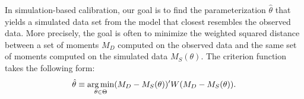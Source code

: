 \noindent In simulation-based calibration, our goal is to find the parameterization $\hat{\theta}$ that yields a simulated data set from the model that closest resembles the observed data. More precisely, the goal is often to minimize the weighted squared distance between a set of moments $M_D$ computed on the observed data and the same set of moments computed on the simulated data $M_S(\theta)$. The criterion function takes the following form:
%
\begin{align*}
    \hat{\theta} \equiv \operatorname*{arg\,min}_{\theta \in \Theta} (M_D - M_S(\theta))' W (M_D - M_S(\theta)).
\end{align*}
